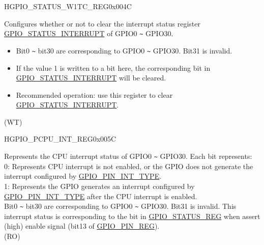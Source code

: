 \begin{register}{H}{GPIO\_STATUS\_W1TC\_REG}{0x004C}\label{regdesc:GPIOSTATUSW1TCREG}
%
\regnewline%
\begin{regdesc}\begin{reglist}
\label{fielddesc:GPIOSTATUSW1TC}\item [GPIO\_STATUS\_W1TC] Configures whether or not to clear the interrupt status register \hyperref[fielddesc:GPIOSTATUSINTERRUPT]{GPIO\_STATUS\_INTERRUPT} of GPIO0 \verb+~+ GPIO30. 
\begin{itemize}
    \item Bit0 \verb+~+ bit30 are corresponding to GPIO0 \verb+~+ GPIO30. Bit31 is invalid.
    \item If the value 1 is written to a bit here, the corresponding bit in \hyperref[fielddesc:GPIOSTATUSINTERRUPT]{GPIO\_STATUS\_INTERRUPT} will be cleared. \item Recommended operation: use this register to clear \hyperref[fielddesc:GPIOSTATUSINTERRUPT]{GPIO\_STATUS\_INTERRUPT}. \end{itemize}(WT)
\end{reglist}\end{regdesc}
\end{register}


\begin{register}{H}{GPIO\_PCPU\_INT\_REG}{0x005C}\label{regdesc:GPIOPCPUINTREG}
%
\regnewline%
\begin{regdesc}\begin{reglist}
\label{fielddesc:GPIOPROCPUINT}\item [GPIO\_PROCPU\_INT] Represents the CPU interrupt status of GPIO0 \verb+~+ GPIO30. Each bit represents:\\
0: Represents CPU interrupt is not enabled, or the GPIO does not generate the interrupt configured by \hyperref[fielddesc:GPIOPINNINTTYPE]{GPIO\_PIN\_INT\_TYPE}.\\
1: Represents the GPIO generates an interrupt configured by \hyperref[fielddesc:GPIOPINNINTTYPE]{GPIO\_PIN\_INT\_TYPE} after the CPU interrupt is enabled.\\
Bit0 \verb+~+ bit30 are corresponding to GPIO0 \verb+~+ GPIO30. Bit31 is invalid. This interrupt status is corresponding to the bit in \hyperref[regdesc:GPIOSTATUSREG]{GPIO\_STATUS\_REG} when assert (high) enable signal (bit13 of \hyperref[regdesc:GPIOPINNREG]{GPIO\_PIN\_REG}). \\
(RO)
\end{reglist}\end{regdesc}
\end{register}








